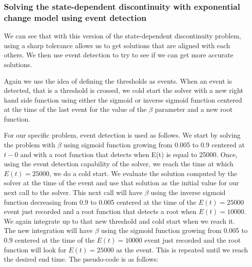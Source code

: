 \subsubsection{Solving the state-dependent discontinuity with exponential change model using event detection}
We can see that with this version of the state-dependent discontinuity problem, using a sharp tolerance allows us to get solutions that are aligned with each others. We then use event detection to try to see if we can get more accurate solutions.

Again we use the idea of defining the thresholds as events. When an event is detected, that is a threshold is crossed, we cold start the solver with a new right hand side function using either the sigmoid or inverse sigmoid function centered at the time of the last event for the value of the $\beta$ parameter and a new root function. 

For our specific problem, event detection is used as follows.
We start by solving the problem with $\beta$ using sigmoid function growing from 0.005 to 0.9 centered at $t-0$ and with a root function that detects when E(t) is equal to 25000. Once, using the event detection capability of the solver, we reach the time at which $E(t)=25000$, we do a cold start. We evaluate the solution computed by the solver at the time of the event and use that solution as the initial value for our next call to the solver. This next call will have $\beta$ using the inverse sigmoid function decreasing from 0.9 to 0.005 centered at the time of the $E(t)=25000$ event just recorded and a root function that detects a root when $E(t)=10000$. We again integrate up to that new threshold and cold start when we reach it. The new integration will have $\beta$ using the sigmoid function growing from 0.005 to 0.9 centered at the time of the $E(t)=10000$ event just recorded and the root function will look for $E(t)=25000$ as the event. This is repeated until we reach the desired end time. The pseudo-code is as follows:

